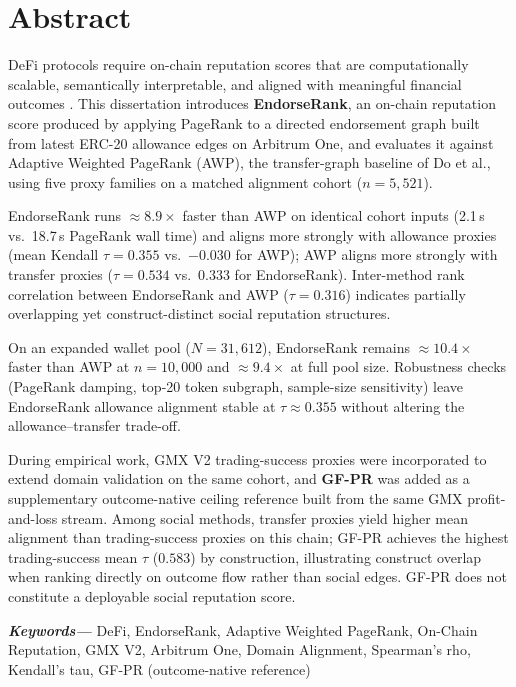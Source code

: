 
\chapter*{Abstract}

\label{ch:abstract}

DeFi protocols require on-chain reputation scores that are computationally scalable, semantically interpretable, and aligned with meaningful financial outcomes . This dissertation introduces \textbf{EndorseRank}, an on-chain reputation score produced by applying PageRank to a directed endorsement graph built from latest ERC-20 allowance edges on Arbitrum One, and evaluates it against Adaptive Weighted PageRank (AWP), the transfer-graph baseline of Do et al., using five proxy families on a matched alignment cohort ($n=5{,}521$).

EndorseRank runs $\approx 8.9\times$ faster than AWP on identical cohort inputs (2.1\,s vs.\ 18.7\,s PageRank wall time) and aligns more strongly with allowance proxies (mean Kendall $\tau=0.355$ vs.\ $-0.030$ for AWP); AWP aligns more strongly with transfer proxies ($\tau=0.534$ vs.\ $0.333$ for EndorseRank). Inter-method rank correlation between EndorseRank and AWP ($\tau=0.316$) indicates partially overlapping yet construct-distinct social reputation structures.

On an expanded wallet pool ($N=31{,}612$), EndorseRank remains $\approx 10.4\times$ faster than AWP at $n=10{,}000$ and $\approx 9.4\times$ at full pool size. Robustness checks (PageRank damping, top-20 token subgraph, sample-size sensitivity) leave EndorseRank allowance alignment stable at $\tau \approx 0.355$ without altering the allowance--transfer trade-off.

During empirical work, GMX V2 trading-success proxies were incorporated to extend domain validation on the same cohort, and \textbf{GF-PR} was added as a supplementary outcome-native ceiling reference built from the same GMX profit-and-loss stream. Among social methods, transfer proxies yield higher mean alignment than trading-success proxies on this chain; GF-PR achieves the highest trading-success mean $\tau$ ($0.583$) by construction, illustrating construct overlap when ranking directly on outcome flow rather than social edges. GF-PR does not constitute a deployable social reputation score.

\textbf{\emph{Keywords---}} DeFi, EndorseRank, Adaptive Weighted PageRank, On-Chain Reputation, GMX V2, Arbitrum One, Domain Alignment, Spearman's rho, Kendall's tau, GF-PR (outcome-native reference)
